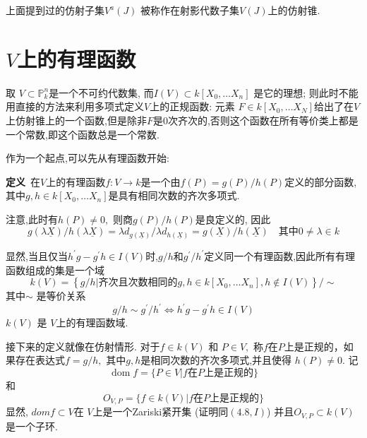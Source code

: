 \documentclass[UTF8]{book}
\begin{document}
		
		上面提到过的仿射子集$V ^{ a }( J )$ 被称作在射影代数子集$ V(J) $上的仿射锥.
		
		
	\section{$ V $上的有理函数}
		取 $V \subset \mathbb{P} ^{ n }_{k}$是一个不可约代数集, 而$I ( V ) \subset k \left[ X _{0}, \ldots X _{ n }\right]$ 是它的理想; 则此时不能用直接的方法来利用多项式定义$ V $上的正规函数: 元素 $F \in k \left[ X _{0}, \ldots X _{ N }\right]$给出了在$ V $上仿射锥上的一个函数,但是除非$ F $是0次齐次的,否则这个函数在所有等价类上都是一个常数,即这个函数总是一个常数.
		
		
		作为一个起点,可以先从有理函数开始:
		
		
		\textbf{定义}\ 在$V$上的有理函数$f : V \rightarrow k$是一个由$f ( P )= g ( P ) / h ( P )$定义的部分函数,其中$ g , h \in k \left[ X _{0}, \ldots X _{ n }\right]$是具有相同次数的齐次多项式.
		
		注意,此时有$h ( P ) \neq 0,$ 则商$g ( P ) / h ( P )$是良定义的, 因此
		\begin{equation*}
		g (\lambda \underline{ X }) / h (\lambda \underline{ X })=\lambda d _{ g (\underline{ X }) }/ \lambda d _{ h (\underline{ X })}= g (\underline{ X }) / h (\underline{ X }) \quad \text {其中} 0 \neq \lambda \in k
		\end{equation*}
		
		
		显然,当且仅当$h ^{\prime} g - g ^{\prime} h \in I ( V )$时,$g / h$和$g ^{\prime} / h ^{\prime}$定义同一个有理函数,因此所有有理函数组成的集是一个域
		\begin{equation*}
		k ( V )=\left\{ g / h | \text {齐次且次数相同的} g , h \in k \left[ X _{0}, \ldots X _{ n }\right], h \notin I ( V )\right\} / \sim
		\end{equation*}
		其中$\sim$ 是等价关系
		\begin{equation*}
		g / h \sim g ^{\prime} / h ^{\prime} \Longleftrightarrow h ^{\prime} g - g ^{\prime} h \in I ( V )
		\end{equation*}
		$k ( V )$ 是 $V$上的有理函数域. 
		
		
		接下来的定义就像在仿射情形. 对于$f \in k ( V )$ 和 $P \in V ,$ 称$f$在$P$上是正规的，如果存在表达式$f = g / h ,$ 其中$g , h$是相同次数的齐次多项式,并且使得 $h ( P ) \neq 0 .$ 记
		\begin{equation*}
		\operatorname{dom} f =\{ P \in V | f \text {在} P \text{上是正规的}\}
		\end{equation*}
		和
		\begin{equation*}
		O _{ V , P }=\{ f \in k ( V ) | f \text {在} P \text{上是正规的}\}
		\end{equation*}
		显然, $dom f \subset V$在 $V$上是一个Zariski紧开集 (证明同$(4.8, I )$) 并且$O _{ V , P } \subset k ( V )$ 是一个子环.
		
\end{document}
